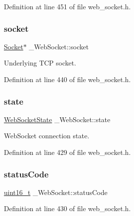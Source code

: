 Definition at line 451 of file web\+\_\+socket.\+h.

\mbox{\label{struct__WebSocket_a56127e9446d0372f444135b0fe6c50cc}} 
\subsubsection{\texorpdfstring{socket}{socket}}
{\footnotesize\ttfamily \hyperlink{socket_8h_aa85acfb0fa336ef495e6ba87fb88fc48}{Socket}$\ast$ \+\_\+\+Web\+Socket\+::socket}



Underlying T\+CP socket. 



Definition at line 440 of file web\+\_\+socket.\+h.

\mbox{\label{struct__WebSocket_aa865e4c0ffd2c25b2f0ed29217d29c4c}} 
\subsubsection{\texorpdfstring{state}{state}}
{\footnotesize\ttfamily \hyperlink{web__socket_8h_a84047dc3e004de841d87c90be9dcd0f0}{Web\+Socket\+State} \+\_\+\+Web\+Socket\+::state}



Web\+Socket connection state. 



Definition at line 429 of file web\+\_\+socket.\+h.

\mbox{\label{struct__WebSocket_a25418037440af5779aa43da69eb091fd}} 
\subsubsection{\texorpdfstring{status\+Code}{statusCode}}
{\footnotesize\ttfamily \hyperlink{stdint_8h_a273cf69d639a59973b6019625df33e30}{uint16\+\_\+t} \+\_\+\+Web\+Socket\+::status\+Code}



Definition at line 430 of file web\+\_\+socket.\+h.

